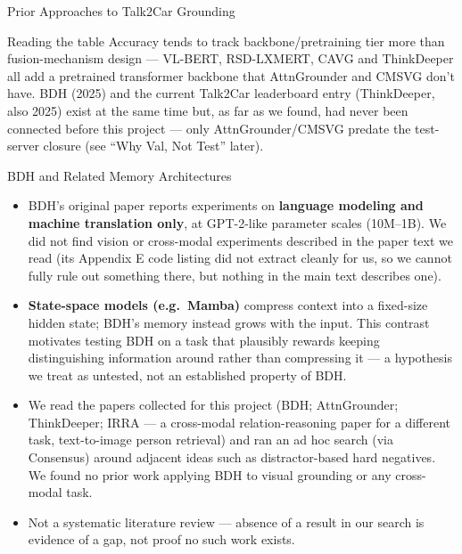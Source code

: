 \documentclass[aspectratio=169]{beamer}
\begin{document}
\begin{frame}{Prior Approaches to Talk2Car Grounding}
\begin{center}
{  }
  \end{center}
  \vspace{-0.2cm}
  \begin{block}{Reading the table}
    \scriptsize Accuracy tends to track backbone/pretraining tier more
    than fusion-mechanism design — VL-BERT, RSD-LXMERT, CAVG and
    ThinkDeeper all add a pretrained transformer backbone that
    AttnGrounder and CMSVG don't have. BDH (2025) and the current
    Talk2Car leaderboard entry (ThinkDeeper, also 2025) exist at the
    same time but, as far as we found, had never been connected before
    this project — only AttnGrounder/CMSVG predate the test-server
    closure (see ``Why Val, Not Test'' later).
  \end{block}
\end{frame}

\begin{frame}{BDH and Related Memory Architectures}
  \small
  \begin{itemize}\setlength{\itemsep}{3pt}
    \item BDH's original paper reports experiments on \textbf{language
      modeling and machine translation only}, at GPT-2-like parameter
      scales (10M--1B). We did not find vision or cross-modal
      experiments described in the paper text we read (its Appendix E
      code listing did not extract cleanly for us, so we cannot fully
      rule out something there, but nothing in the main text describes
      one).
    \item \textbf{State-space models (e.g.\ Mamba)} compress context
      into a fixed-size hidden state; BDH's memory instead grows with
      the input. This contrast motivates testing BDH on a task that
      plausibly rewards keeping distinguishing information around
      rather than compressing it — a hypothesis we treat as untested,
      not an established property of BDH.
    \item We read the papers collected for this project (BDH;
      AttnGrounder; ThinkDeeper; IRRA — a cross-modal relation-reasoning
      paper for a different task, text-to-image person retrieval) and
      ran an ad hoc search (via Consensus) around adjacent ideas such as
      distractor-based hard negatives. We found no prior work applying
      BDH to visual grounding or any cross-modal task.
    \item Not a systematic literature review — absence of a result in
      our search is evidence of a gap, not proof no such work exists.
  \end{itemize}
\end{frame}
\end{document}
